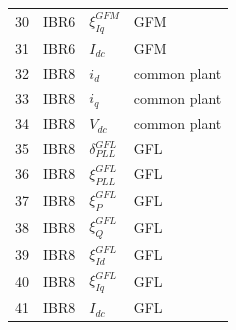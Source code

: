 \begin{longtable}{@{}r l l l@{}}
30 & IBR6 & $\xi_{Iq}^{GFM}$ & GFM \\ 
31 & IBR6 & $I_{dc}$ & GFM \\ 
32 & IBR8 & $i_d$ & common plant \\ 
33 & IBR8 & $i_q$ & common plant \\ 
34 & IBR8 & $V_{dc}$ & common plant \\ 
35 & IBR8 & $\delta_{PLL}^{GFL}$ & GFL \\ 
36 & IBR8 & $\xi_{PLL}^{GFL}$ & GFL \\ 
37 & IBR8 & $\xi_{P}^{GFL}$ & GFL \\ 
38 & IBR8 & $\xi_{Q}^{GFL}$ & GFL \\ 
39 & IBR8 & $\xi_{Id}^{GFL}$ & GFL \\ 
40 & IBR8 & $\xi_{Iq}^{GFL}$ & GFL \\ 
41 & IBR8 & $I_{dc}$ & GFL \\ 
\bottomrule
\end{longtable}
